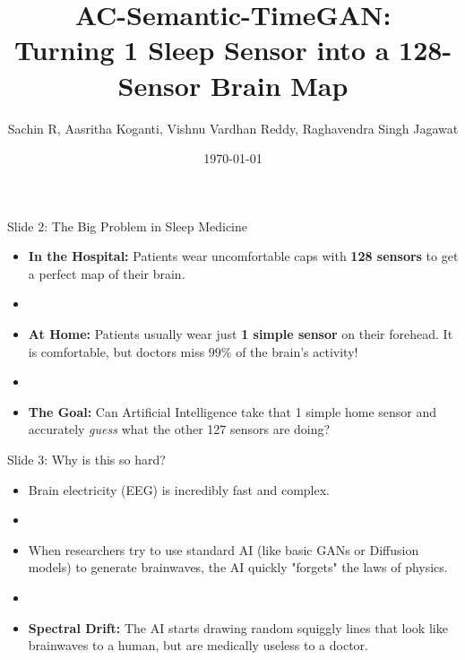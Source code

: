 \documentclass[aspectratio=169]{beamer}
\title[Dream GAN: Brainwaves to Emotions]{AC-Semantic-TimeGAN: \\ Turning 1 Sleep Sensor into a 128-Sensor Brain Map}
\author[Sachin R. et al.]{Sachin R, Aasritha Koganti, Vishnu Vardhan Reddy, Raghavendra Singh Jagawat}
\date{\today}
\newcommand{\easysize}{\large}
\begin{document}

\begin{frame}
    \titlepage
\end{frame}

\begin{frame}{Slide 2: The Big Problem in Sleep Medicine}
    \easysize
    \begin{itemize}
        \item \textbf{In the Hospital:} Patients wear uncomfortable caps with \textbf{128 sensors} to get a perfect map of their brain.
        \item \vspace{0.3cm}
        \item \textbf{At Home:} Patients usually wear just \textbf{1 simple sensor} on their forehead. It is comfortable, but doctors miss $99\%$ of the brain's activity!
        \item \vspace{0.3cm}
        \item \textbf{The Goal:} Can Artificial Intelligence take that 1 simple home sensor and accurately \textit{guess} what the other 127 sensors are doing?
    \end{itemize}
\end{frame}

\begin{frame}{Slide 3: Why is this so hard?}
    \easysize
    \begin{itemize}
        \item Brain electricity (EEG) is incredibly fast and complex.
        \item \vspace{0.3cm}
        \item When researchers try to use standard AI (like basic GANs or Diffusion models) to generate brainwaves, the AI quickly "forgets" the laws of physics.
        \item \vspace{0.3cm}
        \item \textbf{Spectral Drift:} The AI starts drawing random squiggly lines that look like brainwaves to a human, but are medically useless to a doctor.
    \end{itemize}
\end{frame}
\end{document}
